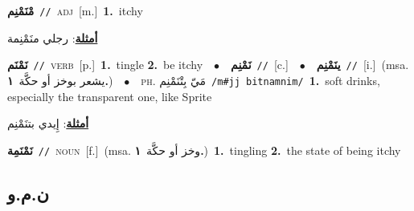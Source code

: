 \documentclass[10pt,a4paper,twoside]{article} %
\begin{document}
\begin{multicols}{2}
{\setlength\topsep{0pt}\textbf{\foreignlanguage{arabic}{مْنَمْنِم}}\ {\color{gray}\texttt{//}\color{black}}\ \textsc{adj}\ [m.]\ \textbf{1.}~itchy\  \begin{flushright}\color{gray}\foreignlanguage{arabic}{\textbf{\underline{\foreignlanguage{arabic}{أمثلة}}}: رجلي منَمْنِمة}\end{flushright}\color{black}} \vspace{2mm}

{\setlength\topsep{0pt}\textbf{\foreignlanguage{arabic}{نَمْنَم}}\ {\color{gray}\texttt{//}\color{black}}\ \textsc{verb}\ [p.]\ \textbf{1.}~tingle  \textbf{2.}~be itchy\ \ $\bullet$\ \ \setlength\topsep{0pt}\textbf{\foreignlanguage{arabic}{نَمْنِم}}\ {\color{gray}\texttt{//}\color{black}}\ [c.]\ \ $\bullet$\ \ \setlength\topsep{0pt}\textbf{\foreignlanguage{arabic}{ينَمْنِم}}\ {\color{gray}\texttt{//}\color{black}}\ [i.]\ \color{gray}(msa. \foreignlanguage{arabic}{يشعر بوخز أو حكَّة}~\foreignlanguage{arabic}{\textbf{١.}})\color{black}\ \ $\bullet$\ \ \textsc{ph.} \color{gray} \foreignlanguage{arabic}{مَيّ بِتْنَمْنِم}\color{black}\ {\color{gray}\texttt{/{\sffamily m\#jj bitnamnim}/}\color{black}}\ \textbf{1.}~soft drinks, especially the transparent one, like Sprite\  \begin{flushright}\color{gray}\foreignlanguage{arabic}{\textbf{\underline{\foreignlanguage{arabic}{أمثلة}}}: إِيدي بتنَمْنِم}\end{flushright}\color{black}} \vspace{2mm}

{\setlength\topsep{0pt}\textbf{\foreignlanguage{arabic}{نَمْنَمِة}}\ {\color{gray}\texttt{//}\color{black}}\ \textsc{noun}\ [f.]\ \color{gray}(msa. \foreignlanguage{arabic}{وخز أو حكَّة}~\foreignlanguage{arabic}{\textbf{١.}})\color{black}\ \textbf{1.}~tingling  \textbf{2.}~the state of being itchy\ } \vspace{2mm}

\vspace{-3mm}
\subsection*{\color{blue}\foreignlanguage{arabic}{ن.م.و}\color{blue}{}} 


\end{multicols}
\end{document}
